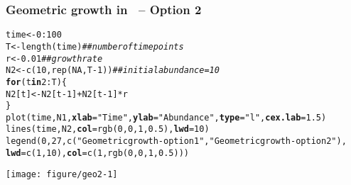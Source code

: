 \documentclass[color=usenames,dvipsnames]{beamer}\usepackage[]{graphicx}\usepackage[]{color}
\makeatletter
\newcommand{\hlnum}[1]{\textcolor[rgb]{0.69,0.494,0}{#1}}%
\newcommand{\hlstr}[1]{\textcolor[rgb]{0.749,0.012,0.012}{#1}}%
\newcommand{\hlcom}[1]{\textcolor[rgb]{0.514,0.506,0.514}{\textit{#1}}}%
\newcommand{\hlopt}[1]{\textcolor[rgb]{0,0,0}{#1}}%
\newcommand{\hlstd}[1]{\textcolor[rgb]{0,0,0}{#1}}%
\newcommand{\hlkwa}[1]{\textcolor[rgb]{0,0,0}{\textbf{#1}}}%
\newcommand{\hlkwb}[1]{\textcolor[rgb]{0,0.341,0.682}{#1}}%
\newcommand{\hlkwc}[1]{\textcolor[rgb]{0,0,0}{\textbf{#1}}}%
\newcommand{\hlkwd}[1]{\textcolor[rgb]{0.004,0.004,0.506}{#1}}%
\newenvironment{kframe}{%
 \def\at@end@of@kframe{}%
 \ifinner\ifhmode%
  \def\at@end@of@kframe{\end{minipage}}%
  \begin{minipage}{\columnwidth}%
 \fi\fi%
 \def\FrameCommand##1{\hskip\@totalleftmargin \hskip-\fboxsep
 \colorbox{shadecolor}{##1}\hskip-\fboxsep
     \hskip-\linewidth \hskip-\@totalleftmargin \hskip\columnwidth}%
 \MakeFramed {\advance\hsize-\width
   \@totalleftmargin\z@ \linewidth\hsize
   \@setminipage}}%
 {\par\unskip\endMakeFramed%
 \at@end@of@kframe}
\newenvironment{knitrout}{}{} %
\makeatother
\begin{document}
\begin{frame}[fragile]
  \frametitle{Geometric growth in \R~-- Option 2}
\begin{knitrout}\tiny
{}\color{fgcolor}\begin{kframe}
\begin{alltt}
\hlstd{time} \hlkwb{<-} \hlnum{0}\hlopt{:}\hlnum{100}
\hlstd{T} \hlkwb{<-} \hlkwd{length}\hlstd{(time)}     \hlcom{## number of time points}
\hlstd{r} \hlkwb{<-} \hlnum{0.01}             \hlcom{## growth rate}
\hlstd{N2} \hlkwb{<-} \hlkwd{c}\hlstd{(}\hlnum{10}\hlstd{,} \hlkwd{rep}\hlstd{(}\hlnum{NA}\hlstd{, T}\hlopt{-}\hlnum{1}\hlstd{))}  \hlcom{## initial abundance = 10}
\hlkwa{for}\hlstd{(t} \hlkwa{in} \hlnum{2}\hlopt{:}\hlstd{T) \{}
    \hlstd{N2[t]} \hlkwb{<-} \hlstd{N2[t}\hlopt{-}\hlnum{1}\hlstd{]} \hlopt{+} \hlstd{N2[t}\hlopt{-}\hlnum{1}\hlstd{]}\hlopt{*}\hlstd{r}
\hlstd{\}}
\hlkwd{plot}\hlstd{(time, N1,} \hlkwc{xlab}\hlstd{=}\hlstr{"Time"}\hlstd{,} \hlkwc{ylab}\hlstd{=}\hlstr{"Abundance"}\hlstd{,} \hlkwc{type}\hlstd{=}\hlstr{"l"}\hlstd{,} \hlkwc{cex.lab}\hlstd{=}\hlnum{1.5}\hlstd{)}
\hlkwd{lines}\hlstd{(time, N2,} \hlkwc{col}\hlstd{=}\hlkwd{rgb}\hlstd{(}\hlnum{0}\hlstd{,}\hlnum{0}\hlstd{,}\hlnum{1}\hlstd{,}\hlnum{0.5}\hlstd{),} \hlkwc{lwd}\hlstd{=}\hlnum{10}\hlstd{)}
\hlkwd{legend}\hlstd{(}\hlnum{0}\hlstd{,} \hlnum{27}\hlstd{,} \hlkwd{c}\hlstd{(}\hlstr{"Geometric growth - option 1"}\hlstd{,} \hlstr{"Geometric growth - option 2"}\hlstd{),}
       \hlkwc{lwd}\hlstd{=}\hlkwd{c}\hlstd{(}\hlnum{1}\hlstd{,}\hlnum{10}\hlstd{),} \hlkwc{col}\hlstd{=}\hlkwd{c}\hlstd{(}\hlnum{1}\hlstd{,} \hlkwd{rgb}\hlstd{(}\hlnum{0}\hlstd{,}\hlnum{0}\hlstd{,}\hlnum{1}\hlstd{,}\hlnum{0.5}\hlstd{)))}
\end{alltt}
\end{kframe}

{\centering \texttt{[image: figure/geo2-1]} 

}



\end{knitrout}
\end{frame}
\end{document}

